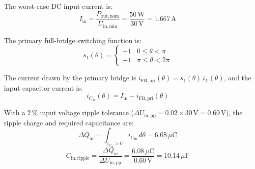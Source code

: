 \documentclass{PELsmallreport}
\begin{document}
     \begin{framed}
        \vspace{2em}
           The worst-case DC input current is:
            \begin{equation}
                I_\mathrm{in} = \frac{P_\mathrm{out,nom}}{U_\mathrm{in,min}}
                              = \frac{50\,\mathrm{W}}{30\,\mathrm{V}}
                              = 1.667\,\mathrm{A}
            \end{equation}
            
            The primary full-bridge switching function is:
            \begin{equation}
                s_1(\theta) = \begin{cases}
                    +1 & 0 \le \theta < \pi \\
                    -1 & \pi \le \theta < 2\pi
                \end{cases}
            \end{equation}
            
            The current drawn by the primary bridge is $i_\mathrm{FB,pri}(\theta) = s_1(\theta)\,i_L(\theta)$,
            and the input capacitor current is:
            \begin{equation}
                i_{C_\mathrm{in}}(\theta) = I_\mathrm{in} - i_\mathrm{FB,pri}(\theta)
            \end{equation}
            
            With a 2\,\% input voltage ripple tolerance
            ($\Delta U_\mathrm{in,pp} = 0.02 \times 30\,\mathrm{V} = 0.60\,\mathrm{V}$),
            the ripple charge and required capacitance are:
            \begin{equation}
                \Delta Q_\mathrm{in} = \int_{i_{C_\mathrm{in}}>0} i_{C_\mathrm{in}}\,d\theta
                                     = 6.08\,\mu\mathrm{C}
            \end{equation}
            \begin{equation}
                C_\mathrm{in,ripple} = \frac{\Delta Q_\mathrm{in}}{\Delta U_\mathrm{in,pp}}
                                     = \frac{6.08\,\mu\mathrm{C}}{0.60\,\mathrm{V}}
                                     = 10.14\,\mu\mathrm{F}
            \end{equation}
        \vspace{2em}
    \end{framed}
            
      \quad
    \hfill{}  
\end{document}
